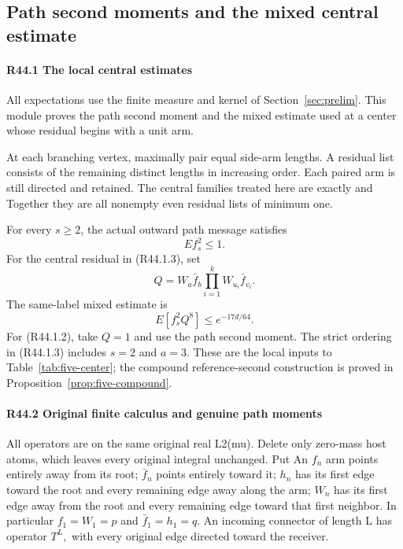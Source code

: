 \subsection{Path second moments and the mixed central estimate}\label{proof:R2-C044}
\paragraph{R44.1 The local central estimates}

All expectations use the finite measure and kernel of
Section~\ref{sec:prelim}. This module proves the path second moment
and the mixed estimate used at a center whose residual begins with
a unit arm.

At each branching vertex, maximally pair equal side-arm lengths. A
residual list consists of the remaining distinct lengths in increasing
order. Each paired arm is still directed and retained. The central
families treated here are exactly
and
Together they are all nonempty even residual lists of minimum one.

For every \(s\ge2\), the actual outward path message satisfies
\[
  E f_s^2\le1.
\]
For the central residual in (R44.1.3), set
\[
  Q=W_a\bar f_b\prod_{i=1}^k W_{u_i}\bar f_{v_i}.
\]
The same-label mixed estimate is
\[
  E[f_s^2Q^8]\le e^{-17d/64}.
\]
For (R44.1.2), take \(Q=1\) and use the path second moment.
The strict ordering in (R44.1.3) includes \(s=2\) and \(a=3\).
These are the local inputs to Table~\ref{tab:five-center}; the
compound reference-second construction is proved in
Proposition~\ref{prop:five-compound}.

\paragraph{R44.2 Original finite calculus and genuine path moments}

All operators are on the same original real L2(mu). Delete only
zero-mass host atoms, which leaves every original integral unchanged. Put
An \(f_n\) arm points entirely away from its root; \(\bar f_n\) points entirely
toward it; \(h_n\) has its first edge toward the root and every remaining
edge away along the arm; \(W_n\) has its first edge away from the root and
every remaining edge toward that first neighbor. In particular
\(f_1=W_1=p\) and \(\bar f_1=h_1=q.\) An incoming connector of length L has
operator \(T^L,\allowbreak \) with every original edge directed toward the receiver.


